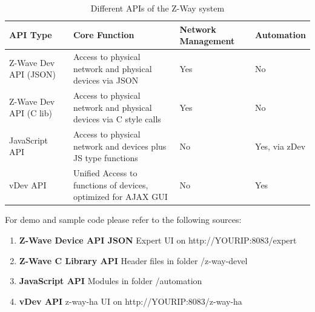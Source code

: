 \begin{table}
\begin{tabular}{|p{40mm}|p{50mm}|p{20mm}|p{20mm}|}
\hline
API Type &	Core Function & Network Management & Automation\\
\hline
Z-Wave Dev API (JSON)	& Access to physical network and physical devices via JSON	&
Yes	&No\\
\hline
Z-Wave Dev API (C lib) 	& Access to physical network and physical devices via C style calls &
Yes	&No\\
\hline
JavaScript API & Access to physical network and devices plus JS type functions	&
No	&Yes, via zDev\\
\hline
vDev API & Unified Access to functions of devices, optimized for AJAX GUI&
No	&Yes\\
\hline
\hline
\end{tabular}
\caption{Different APIs of the Z-Way system} 
\label{c1:comp}
\end{table}		

For demo and sample code please refer to the following sources:

\begin{enumerate}
\item \textbf{Z-Wave Device API JSON} Expert UI on http://YOURIP:8083/expert
\item \textbf{Z-Wave C Library API} Header files in folder /z-way-devel 
\item \textbf{JavaScript API} Modules in folder /automation
\item \textbf{vDev API} z-way-ha UI on http://YOURIP:8083/z-way-ha
\end{enumerate}




 